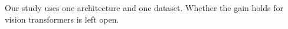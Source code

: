 Our study uses one architecture and one dataset. Whether the gain holds for vision transformers is
left open.
